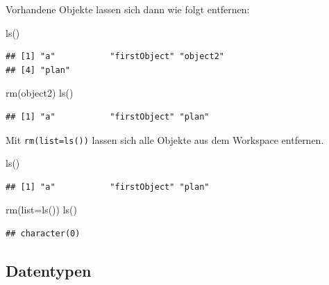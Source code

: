 \documentclass[
]{book}
\newenvironment{Shaded}{\begin{snugshade}}{\end{snugshade}}
\newcommand{\AttributeTok}[1]{\textcolor[rgb]{0.77,0.63,0.00}{#1}}
\newcommand{\FunctionTok}[1]{\textcolor[rgb]{0.00,0.00,0.00}{#1}}
\newcommand{\NormalTok}[1]{#1}
\begin{document}
Vorhandene Objekte lassen sich dann wie folgt entfernen:

\begin{Shaded}
\begin{Highlighting}[]
\FunctionTok{ls}\NormalTok{()}
\end{Highlighting}
\end{Shaded}

\begin{verbatim}
## [1] "a"           "firstObject" "object2"    
## [4] "plan"
\end{verbatim}

\begin{Shaded}
\begin{Highlighting}[]
\FunctionTok{rm}\NormalTok{(object2)}
\FunctionTok{ls}\NormalTok{()}
\end{Highlighting}
\end{Shaded}

\begin{verbatim}
## [1] "a"           "firstObject" "plan"
\end{verbatim}

Mit \texttt{rm(list=ls())} lassen sich alle Objekte aus dem Workspace entfernen.

\begin{Shaded}
\begin{Highlighting}[]
\FunctionTok{ls}\NormalTok{()}
\end{Highlighting}
\end{Shaded}

\begin{verbatim}
## [1] "a"           "firstObject" "plan"
\end{verbatim}

\begin{Shaded}
\begin{Highlighting}[]
\FunctionTok{rm}\NormalTok{(}\AttributeTok{list=}\FunctionTok{ls}\NormalTok{())}
\FunctionTok{ls}\NormalTok{()}
\end{Highlighting}
\end{Shaded}

\begin{verbatim}
## character(0)
\end{verbatim}

\hypertarget{datentypen}{%
\subsection*{Datentypen}\label{datentypen}}
\end{document}
